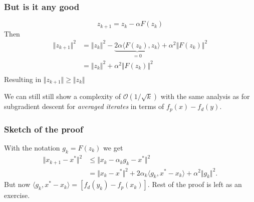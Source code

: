 \documentclass{beamer}
\begin{document}
\begin{frame}
  \frametitle{But is it any good}
  \begin{equation}
    z_{k+1} = z_k - \alpha F(z_k)
  \end{equation}
  Then
  \begin{equation}
    \begin{aligned}
      \Vert z_{k+1} \Vert^2 &= \Vert z_k \Vert^2 - \underbrace{2 \alpha \langle F(z_k), z_k \rangle}_{=0} + \alpha^2 \Vert F(z_k) \Vert^2 \\
      &=\Vert z_k \Vert^2 + \alpha^2 \Vert F(z_k) \Vert^2 \\
    \end{aligned}
  \end{equation}
  Resulting in $\Vert z_{k+1} \Vert \ge \Vert z_k \Vert$
  \begin{theorem}
    We can still still show a complexity of $\mathcal{O}(1/\sqrt{k})$ with the same analysis as for subgradient descent for \emph{averaged iterates} in terms of $f_p(x) - f_d(y)$.
  \end{theorem}
\end{frame}

\begin{frame}
  \frametitle{Sketch of the proof}
  With the notation $g_k = F(z_k)$ we get
  \begin{equation}
    \begin{aligned}
      \Vert x_{k+1} - x^* \Vert^2 &\le \Vert x_k - \alpha_k g_k - x^* \Vert^2 \\
      &= \Vert x_k-x^* \Vert^2 + 2 \alpha_k \langle g_k, x^*-x_k \rangle + \alpha^2 \Vert g_k \Vert^2.
    \end{aligned}
  \end{equation}
  But now $\langle g_k, x^* - x_k \rangle = [f_d(y_k) - f_p(x_k)]$.
  Rest of the proof is left as an exercise.
\end{frame}
\end{document}
